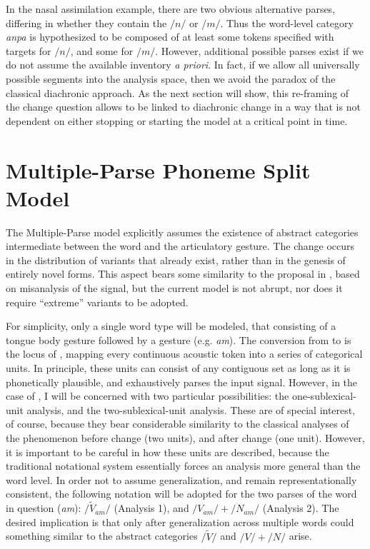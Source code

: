 In the nasal assimilation example, there are two obvious alternative
parses, differing in whether they contain the  $/n/$ or $/m/$. Thus the word-level category \textit{anpa} is hypothesized to be composed
of at least some tokens specified with  targets for $/n/$,
and some for $/m/$. However, additional possible parses exist if
we do not assume the available  inventory \emph{a priori}.
In fact, if we allow all universally possible segments into the analysis
space, then we avoid the  paradox of the classical diachronic
approach. As the next section will show, this re-framing of the change
question allows  to be linked to diachronic change
in a way that is not dependent on either stopping or starting the
model at a critical point in time. 

\section{Multiple-Parse Phoneme Split Model}
\largerpage
The Multiple-Parse model explicitly assumes the existence of abstract categories
intermediate between the word and the articulatory gesture. The change
occurs in the distribution of variants that already exist, rather
than in the genesis of entirely novel forms. This aspect bears some
similarity to the proposal in \citet{Baker2011}, based on misanalysis
of the signal, but the current model is not abrupt, nor does it require
“extreme” variants to be adopted.

For simplicity,
only a single word type will be modeled, that consisting of a tongue
body gesture followed by a  gesture (e.g. \textit{am}).  The conversion from  to  is the locus of 
, mapping every continuous acoustic token into a series of
categorical units. In principle, these units can consist of any contiguous
set as long as it is phonetically plausible, and exhaustively parses
the input signal. However, in the case of , I will
be concerned with two particular possibilities: the one-sublexical-unit
analysis, and the two-sublexical-unit analysis. These are of special
interest, of course, because they bear considerable similarity to
the classical analyses of the phenomenon before change (two units),
and after change (one unit). However, it is important to be careful
in how these units are described, because the traditional notational
system essentially forces an analysis more general than the
word level. In order not to assume generalization, and remain representationally
consistent, the following notation will be adopted for the two 
parses of the word in question (\textit{am}): $/\tilde{V}_{am}/$ (Analysis
1), and $/V_{am}/+/N_{am}/$ (Analysis 2). The desired implication
is that only after generalization across multiple words could something
similar to the abstract categories $/\widetilde{V}/$ and $/V/+/N/$
arise.

